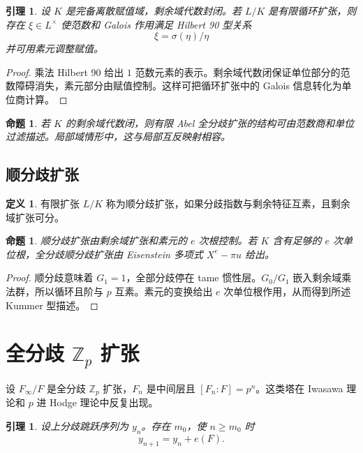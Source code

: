 \documentclass[11pt,a4paper,openany]{ctexbook}
\numberwithin{equation}{chapter}
\newcommand{\Z}{\mathbb{Z}}
\theoremstyle{plain}
\newtheorem{proposition}[theorem]{命题}
\newtheorem{lemma}[theorem]{引理}
\theoremstyle{definition}
\newtheorem{definition}[theorem]{定义}
\theoremstyle{remark}
\begin{document}
\begin{lemma}
设 $K$ 是完备离散赋值域，剩余域代数封闭。若 $L/K$ 是有限循环扩张，则存在 $\xi\in L^\times$ 使范数和 Galois 作用满足 Hilbert 90 型关系
\[
  \xi=\sigma(\eta)/\eta
\]
并可用素元调整赋值。
\end{lemma}

\begin{proof}
乘法 Hilbert 90 给出 $1$ 范数元素的表示。剩余域代数闭保证单位部分的范数障碍消失，素元部分由赋值控制。这样可把循环扩张中的 Galois 信息转化为单位商计算。
\end{proof}

\begin{proposition}
若 $K$ 的剩余域代数闭，则有限 Abel 全分歧扩张的结构可由范数商和单位过滤描述。局部域情形中，这与局部互反映射相容。
\end{proposition}

\subsection{顺分歧扩张}

\begin{definition}
有限扩张 $L/K$ 称为顺分歧扩张，如果分歧指数与剩余特征互素，且剩余域扩张可分。
\end{definition}

\begin{proposition}
顺分歧扩张由剩余域扩张和素元的 $e$ 次根控制。若 $K$ 含有足够的 $e$ 次单位根，全分歧顺分歧扩张由 Eisenstein 多项式 $X^e-\pi u$ 给出。
\end{proposition}

\begin{proof}
顺分歧意味着 $G_1=1$，全部分歧停在 tame 惯性层。$G_0/G_1$ 嵌入剩余域乘法群，所以循环且阶与 $p$ 互素。素元的变换给出 $e$ 次单位根作用，从而得到所述 Kummer 型描述。
\end{proof}

\section{全分歧 \texorpdfstring{$\Z_p$}{Zp} 扩张}

设 $F_\infty/F$ 是全分歧 $\Z_p$ 扩张，$F_n$ 是中间层且 $[F_n:F]=p^n$。这类塔在 Iwasawa 理论和 $p$ 进 Hodge 理论中反复出现。

\begin{lemma}
设上分歧跳跃序列为 $y_n$。存在 $m_0$，使 $n\ge m_0$ 时
\[
  y_{n+1}=y_n+e(F).
\]
\end{lemma}
\end{document}
